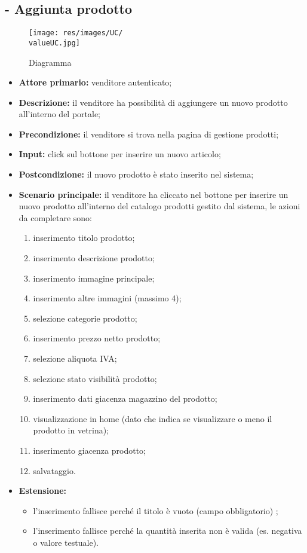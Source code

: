 \stepUserCase
\subsection{ - Aggiunta prodotto}
\begin{figure}[H]
    \centering
    \texttt{[image: res/images/UC/\\valueUC.jpg]}
    \caption{Diagramma }
\end{figure}
\begin{itemize}
    \item \textbf{Attore primario:} venditore autenticato;
    \item \textbf{Descrizione:} il venditore ha possibilità di aggiungere un nuovo prodotto all'interno del portale;
    \item \textbf{Precondizione:} il venditore si trova nella pagina di gestione prodotti;
    \item \textbf{Input:} click sul bottone per inserire un nuovo articolo;
    \item \textbf{Postcondizione:} il nuovo prodotto è stato inserito nel sistema;
    \item \textbf{Scenario principale:} il venditore ha cliccato nel bottone per inserire un nuovo prodotto all'interno del catalogo prodotti gestito dal sistema, le azioni da completare sono:
          \begin{enumerate}
              \item inserimento titolo prodotto;
              \item inserimento descrizione prodotto;
              \item inserimento immagine principale;
              \item inserimento altre immagini (massimo 4);
              \item selezione categorie prodotto;
              \item inserimento prezzo netto prodotto;
              \item selezione aliquota IVA;
              \item selezione stato visibilità prodotto;
              \item inserimento dati giacenza magazzino del prodotto;
              \item visualizzazione in home (dato che indica se visualizzare o meno il prodotto in vetrina);
              \item inserimento giacenza prodotto;
              \item salvataggio.
          \end{enumerate}
    \item \textbf{Estensione:}
          \begin{itemize}
              \item l'inserimento fallisce perché il titolo è vuoto (campo obbligatorio) ;
              \item l'inserimento fallisce perché la quantità inserita non è valida (es. negativa o valore testuale).
          \end{itemize}
\end{itemize}


